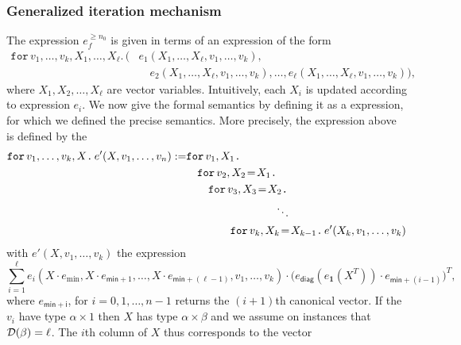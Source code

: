 \subsubsection{Generalized iteration mechanism}\label{subsubsec:generalloop}
The expression $e_f^{\geq n_0}$ is given in terms of an expression of the form 
\begin{align*}
    \texttt{for}\, v_1,\ldots, v_k,X_1,\ldots, X_\ell \texttt{.}\, \Big( &e_1(X_1,\ldots,X_\ell,v_1,\ldots, v_k), \\
    &\hspace{1em}e_2(X_1,\ldots, X_\ell,v_1,\ldots, v_k), \ldots, e_\ell(X_1,\ldots,X_\ell,v_1,\ldots, v_k) \Big),
\end{align*}
where $X_1,X_2,\ldots,X_\ell$ are vector variables. Intuitively, each $X_i$ is updated according to expression $e_i$.
We now give the formal semantics by defining it as a \langfor expression, for which we defined the precise semantics.
More precisely, the expression above is defined by the
\begin{align*}
  \ffor{v_1,\ldots, v_k}{X}{e'(X,v_1,\ldots, v_n)}:= &\ffor{v_1}{X_1}{} \\
  &\hspace{1em}\initf{X_1}{v_2}{X_2}{} \\
  &\hspace{2em}\initf{X_2}{v_3}{X_3}{} \\
  &\hspace{8em}\ddots \\
  &\hspace{4em}\initf{X_{k-1}}{v_k}{X_k}{ e'(X_k,v_1,\ldots, v_k)}
\end{align*}
with $e'(X,v_1,\ldots,v_k)$ the expression
$$
\sum_{i=1}^{\ell} e_i(X\cdot e_{\min}, X\cdot e_{\mathsf{min}+1},\ldots,X\cdot e_{\mathsf{min}+(\ell-1)},v_1,\ldots,v_k)\cdot \bigl(
e_{\mathsf{diag}}(e_{\mathbf{1}}(X^T))\cdot e_{\mathsf{min}+(i-1)}\bigr)^T,
%
$$
where $e_{\mathsf{min}+\mathsf{i}}$, for $i=0,1,\ldots,n-1$ returns the $(i+1)$th canonical vector. If the $v_i$ have
type $\alpha\times 1$ then $X$ has type
$\alpha\times\beta$ and we assume on instances that $\dom(\beta)=\ell$. The $i$th column of  $X$ thus corresponds to the vector

